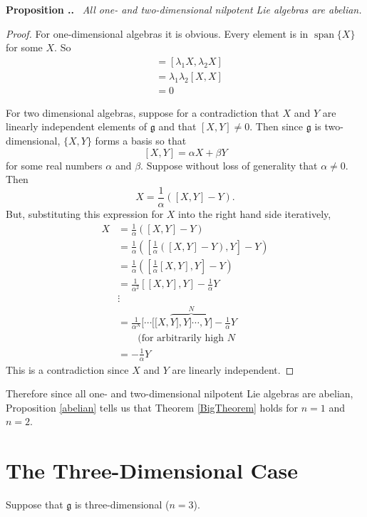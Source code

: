 \documentclass[honours]{UNSWthesis}
\newcommand{\g}{\mathfrak{g}}
\newcommand{\1}{\mathbf{e}_{1}}
\newcommand{\2}{\mathbf{e}_{3}}
\newcommand{\3}{\mathbf{e}_{3}}
\DeclareMathOperator{\spn}{span}
\newcounter{Item}[section]
\newenvironment{Proposition}{\medskip
                            \refstepcounter{Item}
                            \noindent
                           {\bf Proposition \thesection.\theItem.}\ %
                            \begingroup \sl}
                           {\endgroup\medskip}
\begin{document}
\begin{Proposition}
All one- and two-dimensional nilpotent Lie algebras are abelian.
\end{Proposition}

\begin{proof}
For one-dimensional algebras it is obvious. Every element is in $\spn\{X\}$ for some $X$. So 
\begin{align*}
[X_1,X_2] &= [\lambda_1 X, \lambda_2 X] \\
&= \lambda_1 \lambda_2 [X,X] \\
&= 0
\end{align*}

For two dimensional algebras, suppose for a contradiction that $X$ and $Y$ are linearly independent elements of $\g$ and that $[X,Y] \neq 0$. Then since $\g$ is two-dimensional, $\{X,Y\}$ forms a basis so that 
\[
[X,Y] = \alpha X+\beta Y
\]
for some real numbers $\alpha$ and $\beta$. Suppose without loss of generality that $\alpha \neq 0$. Then 
\[
X = \frac{1}{\alpha}([X,Y]-Y).
\]
But, substituting this expression for $X$ into the right hand side iteratively, 
\begin{align*}
X&= \frac{1}{\alpha}([X,Y]-Y) \\
&=  \frac{1}{\alpha}\left( \left[\frac{1}{\alpha}([X,Y]-Y), Y\right]-Y\right) \\
&= \frac{1}{\alpha}\left( \left[\frac{1}{\alpha}[X,Y], Y\right]-Y\right) \\ 
&= \frac{1}{\alpha^2} [[X,Y], Y]-\frac{1}{\alpha} Y \\ 
& \vdots \\
&= \frac{1}{\alpha^N}[\cdots[[X,\overbrace{Y],Y]\cdots ,Y]}^{N}-\frac{1}{\alpha} Y \\
& \quad \quad \text{(for arbitrarily high $N$} \\
&= -\frac{1}{\alpha} Y
\end{align*}
This is a contradiction since $X$ and $Y$ are linearly independent. 
 
\end{proof}

Therefore since all one- and  two-dimensional nilpotent Lie algebras are abelian, Proposition \ref{abelian} tells us that Theorem \ref{BigTheorem} holds for $n=1$ and $n=2$. 

\section{The Three-Dimensional Case}
Suppose that $\g$ is three-dimensional ($n=3$).
\end{document}

